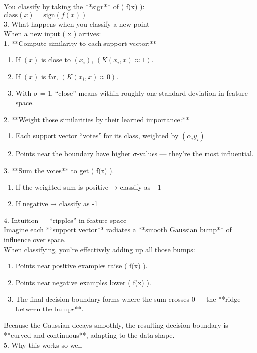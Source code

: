 \documentclass[12pt]{article}
\begin{document}
You classify by taking the **sign** of ( f(x) ): \\
$\text{class}(x) = \text{sign}(f(x))$ \\
3. What happens when you classify a new point \\
When a new input ( x ) arrives: \\
1. **Compute similarity to each support vector:** \\
\begin{enumerate}
  \item If $( x )$ is close to $( x_i )$, $( K(x_i, x) \approx 1 )$.
  \item If $( x )$ is far, $( K(x_i, x) \approx 0 )$.
  \item With $\sigma$ = 1, “close” means within roughly one standard deviation in feature space.
\end{enumerate}
2. **Weight those similarities by their learned importance:**
\begin{enumerate}
  \item Each support vector “votes” for its class, weighted by $( \alpha_i y_i )$.
  \item Points near the boundary have higher $\sigma$-values — they're the most influential.
\end{enumerate}
3. **Sum the votes** to get ( f(x) ).
\begin{enumerate}
  \item If the weighted sum is positive → classify as +1
  \item If negative → classify as -1
\end{enumerate}
4. Intuition — “ripples” in feature space \\
Imagine each **support vector** radiates a **smooth Gaussian bump** of influence over space. \\
When classifying, you're effectively adding up all those bumps: \\
\begin{enumerate}
  \item Points near positive examples raise ( f(x) ).
  \item Points near negative examples lower ( f(x) ).
  \item The final decision boundary forms where the sum crosses 0 — the **ridge between the bumps**.
\end{enumerate}
Because the Gaussian decays smoothly, the resulting decision boundary is **curved and continuous**, adapting to the data shape. \\
5. Why this works so well \\
\end{document}
